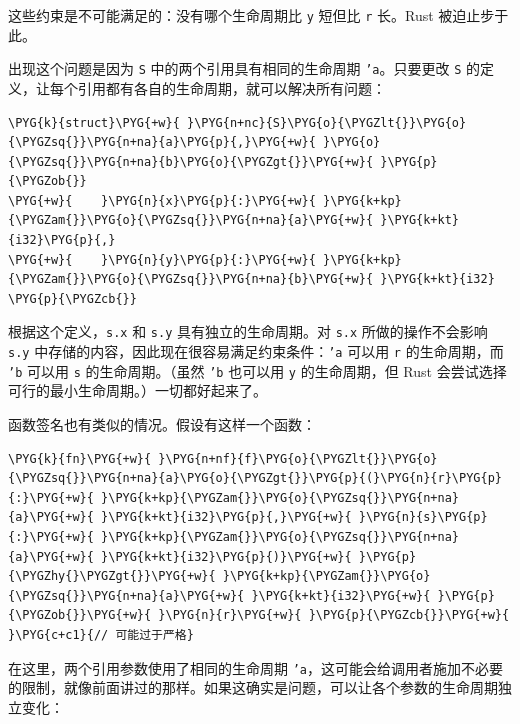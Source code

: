 这些约束是不可能满足的：没有哪个生命周期比 \texttt{y} 短但比 \texttt{r} 长。Rust 被迫止步于此。

出现这个问题是因为 \texttt{S} 中的两个引用具有相同的生命周期 \texttt{'a}。只要更改 \texttt{S} 的定义，让每个引用都有各自的生命周期，就可以解决所有问题：

\begin{Verbatim}[commandchars=\\\{\},breaklines=true,breakanywhere=true,fontsize=\codefont,xleftmargin=17bp]
\PYG{k}{struct}\PYG{+w}{ }\PYG{n+nc}{S}\PYG{o}{\PYGZlt{}}\PYG{o}{\PYGZsq{}}\PYG{n+na}{a}\PYG{p}{,}\PYG{+w}{ }\PYG{o}{\PYGZsq{}}\PYG{n+na}{b}\PYG{o}{\PYGZgt{}}\PYG{+w}{ }\PYG{p}{\PYGZob{}}
\PYG{+w}{    }\PYG{n}{x}\PYG{p}{:}\PYG{+w}{ }\PYG{k+kp}{\PYGZam{}}\PYG{o}{\PYGZsq{}}\PYG{n+na}{a}\PYG{+w}{ }\PYG{k+kt}{i32}\PYG{p}{,}
\PYG{+w}{    }\PYG{n}{y}\PYG{p}{:}\PYG{+w}{ }\PYG{k+kp}{\PYGZam{}}\PYG{o}{\PYGZsq{}}\PYG{n+na}{b}\PYG{+w}{ }\PYG{k+kt}{i32}
\PYG{p}{\PYGZcb{}}
\end{Verbatim}

根据这个定义，\texttt{s.x} 和 \texttt{s.y} 具有独立的生命周期。对 \texttt{s.x} 所做的操作不会影响 \texttt{s.y} 中存储的内容，因此现在很容易满足约束条件：\texttt{'a} 可以用 \texttt{r} 的生命周期，而 \texttt{'b} 可以用 \texttt{s} 的生命周期。（虽然 \texttt{'b} 也可以用 \texttt{y} 的生命周期，但 Rust 会尝试选择可行的最小生命周期。）一切都好起来了。

函数签名也有类似的情况。假设有这样一个函数：

\begin{Verbatim}[commandchars=\\\{\},breaklines=true,breakanywhere=true,fontsize=\codefont,xleftmargin=17bp]
\PYG{k}{fn}\PYG{+w}{ }\PYG{n+nf}{f}\PYG{o}{\PYGZlt{}}\PYG{o}{\PYGZsq{}}\PYG{n+na}{a}\PYG{o}{\PYGZgt{}}\PYG{p}{(}\PYG{n}{r}\PYG{p}{:}\PYG{+w}{ }\PYG{k+kp}{\PYGZam{}}\PYG{o}{\PYGZsq{}}\PYG{n+na}{a}\PYG{+w}{ }\PYG{k+kt}{i32}\PYG{p}{,}\PYG{+w}{ }\PYG{n}{s}\PYG{p}{:}\PYG{+w}{ }\PYG{k+kp}{\PYGZam{}}\PYG{o}{\PYGZsq{}}\PYG{n+na}{a}\PYG{+w}{ }\PYG{k+kt}{i32}\PYG{p}{)}\PYG{+w}{ }\PYG{p}{\PYGZhy{}\PYGZgt{}}\PYG{+w}{ }\PYG{k+kp}{\PYGZam{}}\PYG{o}{\PYGZsq{}}\PYG{n+na}{a}\PYG{+w}{ }\PYG{k+kt}{i32}\PYG{+w}{ }\PYG{p}{\PYGZob{}}\PYG{+w}{ }\PYG{n}{r}\PYG{+w}{ }\PYG{p}{\PYGZcb{}}\PYG{+w}{ }\PYG{c+c1}{// 可能过于严格}
\end{Verbatim}

在这里，两个引用参数使用了相同的生命周期 \texttt{'a}，这可能会给调用者施加不必要的限制，就像前面讲过的那样。如果这确实是问题，可以让各个参数的生命周期独立变化：

